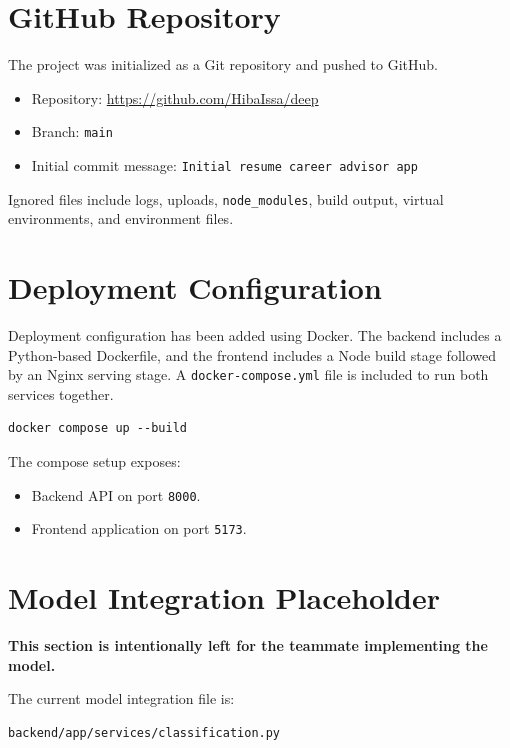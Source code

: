 \documentclass[12pt,a4paper]{article}
\begin{document}
\section{GitHub Repository}

The project was initialized as a Git repository and pushed to GitHub.

\begin{itemize}
    \item Repository: \url{https://github.com/HibaIssa/deep}
    \item Branch: \texttt{main}
    \item Initial commit message: \texttt{Initial resume career advisor app}
\end{itemize}

Ignored files include logs, uploads, \texttt{node\_modules}, build output, virtual environments, and environment files.

\section{Deployment Configuration}

Deployment configuration has been added using Docker. The backend includes a Python-based Dockerfile, and the frontend includes a Node build stage followed by an Nginx serving stage. A \texttt{docker-compose.yml} file is included to run both services together.

\begin{lstlisting}
docker compose up --build
\end{lstlisting}

The compose setup exposes:

\begin{itemize}
    \item Backend API on port \texttt{8000}.
    \item Frontend application on port \texttt{5173}.
\end{itemize}

\section{Model Integration Placeholder}

\textbf{This section is intentionally left for the teammate implementing the model.}

The current model integration file is:

\begin{lstlisting}
backend/app/services/classification.py
\end{lstlisting}
\end{document}
